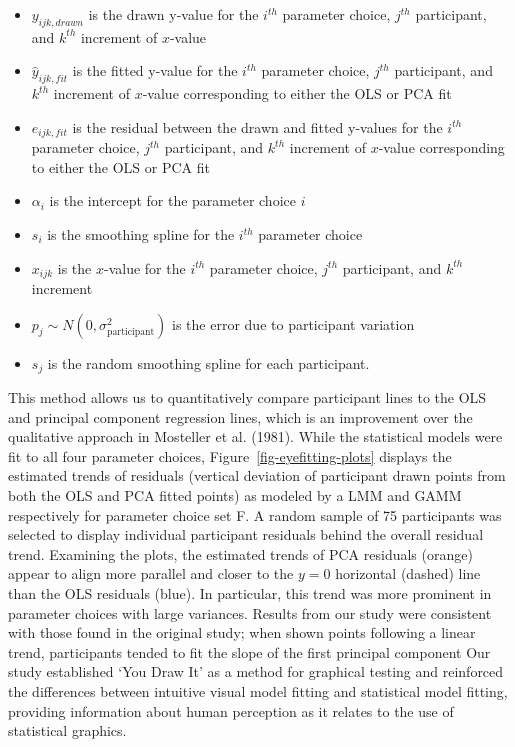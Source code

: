 \documentclass[
]{jds}
\providecommand{\tightlist}{%
  \setlength{\itemsep}{0pt}\setlength{\parskip}{0pt}}\usepackage{longtable,booktabs,array}
\begin{document}
\begin{itemize}
\tightlist
\item
  \(y_{ijk,drawn}\) is the drawn y-value for the \(i^{th}\) parameter
  choice, \(j^{th}\) participant, and \(k^{th}\) increment of
  \(x\)-value
\item
  \(\hat y_{ijk,fit}\) is the fitted y-value for the \(i^{th}\)
  parameter choice, \(j^{th}\) participant, and \(k^{th}\) increment of
  \(x\)-value corresponding to either the OLS or PCA fit
\item
  \(e_{ijk,fit}\) is the residual between the drawn and fitted y-values
  for the \(i^{th}\) parameter choice, \(j^{th}\) participant, and
  \(k^{th}\) increment of \(x\)-value corresponding to either the OLS or
  PCA fit
\item
  \(\alpha_i\) is the intercept for the parameter choice \(i\)
\item
  \(s_{i}\) is the smoothing spline for the \(i^{th}\) parameter choice
\item
  \(x_{ijk}\) is the \(x\)-value for the \(i^{th}\) parameter choice,
  \(j^{th}\) participant, and \(k^{th}\) increment
\item
  \(p_{j} \sim N(0, \sigma^2_\text{participant})\) is the error due to
  participant variation
\item
  \(s_{j}\) is the random smoothing spline for each participant.
\end{itemize}

This method allows us to quantitatively compare participant lines to the
OLS and principal component regression lines, which is an improvement
over the qualitative approach in Mosteller et al. (1981). While the
statistical models were fit to all four parameter choices,
Figure~\ref{fig-eyefitting-plots} displays the estimated trends of
residuals (vertical deviation of participant drawn points from both the
OLS and PCA fitted points) as modeled by a LMM and GAMM respectively for
parameter choice set F. A random sample of 75 participants was selected
to display individual participant residuals behind the overall residual
trend. Examining the plots, the estimated trends of PCA residuals
(orange) appear to align more parallel and closer to the \(y=0\)
horizontal (dashed) line than the OLS residuals (blue). In particular,
this trend was more prominent in parameter choices with large variances.
Results from our study were consistent with those found in the original
study; when shown points following a linear trend, participants tended
to fit the slope of the first principal component Our study established
`You Draw It' as a method for graphical testing and reinforced the
differences between intuitive visual model fitting and statistical model
fitting, providing information about human perception as it relates to
the use of statistical graphics.
\end{document}
